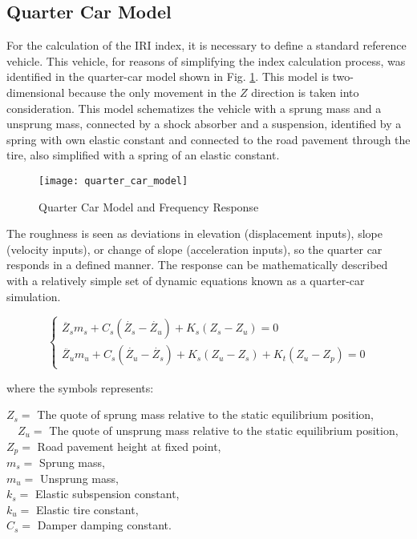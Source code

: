 \documentclass[tesi]{subfiles}
\begin{document}
\subsection{Quarter Car Model}\label{ssc:Quarter Car Model}
For the calculation of the IRI index, it is necessary to define a standard reference vehicle\cite{little_book}. This vehicle, for reasons of simplifying the index calculation process, was identified in the quarter-car model shown in Fig. \ref{fig:Quarter Car Model}. This model is two-dimensional because the only
movement in the $Z$ direction is taken into consideration. This model schematizes the vehicle with a sprung mass and a unsprung mass, connected by a shock absorber and a suspension, identified by a spring with own elastic constant and connected to the road pavement through the tire, also simplified with a spring of an elastic constant\cite{little_book}.

\begin{figure}[H]
\centering
\texttt{[image: quarter\_car\_model]}
\caption{Quarter Car Model and Frequency Response}

\label{fig:Quarter Car Model}
\end{figure}

The roughness is seen as deviations in elevation\cite{gillespie1992everything} (displacement inputs), slope (velocity inputs), or change of slope (acceleration inputs), so the quarter car responds in a defined manner. The response can be mathematically described with a relatively simple set
of dynamic equations known as a quarter-car simulation.


\begin{center}

\[
    \left\{
                \begin{array}{ll}
                  \ddot{Z_{s}} m_{s} + C_{s} ( \dot{Z_{s}} - \dot{Z_{u}} ) + K_{s} (Z_{s} - Z_{u}) = 0\\
                   \ddot{Z_{u}} m_{u} + C_{s} ( \dot{Z_{u}} - \dot{Z_{s}}) + K_{s} (Z_{u} - Z_{s}) + K_{t} ( Z_{u} - Z_{p} ) = 0
                \end{array}
              \right.
\]




\end{center}

where the symbols represents:

\noindent $ Z_{s} =  $ The quote of sprung mass relative to the static equilibrium position,\\
$\quad Z_{u} =  $ The quote of unsprung mass relative to the static equilibrium position,\\
$ Z_{p} = $ Road pavement height at fixed point,\\
$ m_{s} = $ Sprung mass,	\\
$ m_{u} = $ Unsprung mass, \\
$ k_{s} = $ Elastic subspension constant, \\
$ k_{u} = $ Elastic tire constant, \\
$C_{s} = $ Damper damping constant.\\
\end{document}
